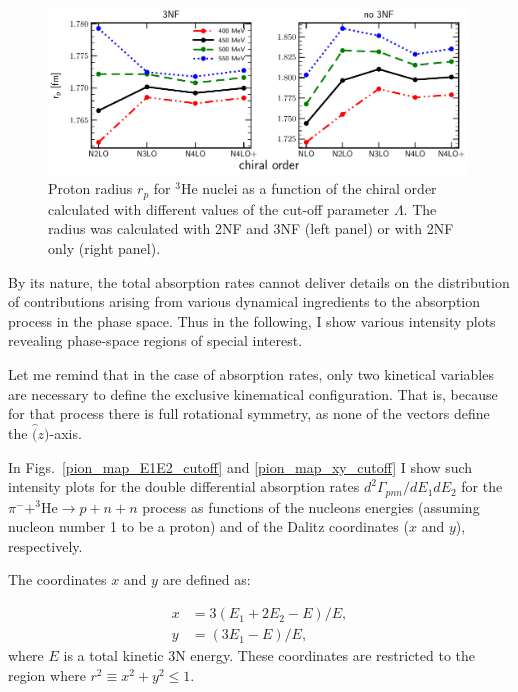     \begin{figure}[h]
        \begin{center}
        \includegraphics[width=0.99\textwidth]{PlotData/PION/Dalitz_maps/figures/proton_radius_mt31_3NF.pdf}
        \end{center}
        \caption{ Proton radius $r_p$ for $^3$He nuclei as a function of the chiral order calculated with
        different values of the cut-off parameter $\Lambda$. The radius was calculated with 2NF and 3NF (left panel)
        or with 2NF only (right panel).}
        \label{proton_rad}
    \end{figure}


    By its nature, the total absorption rates cannot deliver details
    on the distribution of contributions arising from various dynamical ingredients
    to the absorption process in the phase space. Thus in the following, I show 
    various intensity plots revealing phase-space regions of special interest.

    Let me remind that in the case of absorption rates, only two kinetical variables are
    necessary to define the exclusive kinematical configuration. That is, because for that
    process there is full rotational symmetry, as none of the vectors define the $\hat(z)$-axis.


    In Figs.~\ref{pion_map_E1E2_cutoff} and \ref{pion_map_xy_cutoff} I show such
    intensity plots for the double differential absorption rates
    $d^2 \Gamma_{pnn}/dE_1dE_2$ for the $\pi^- + ^3\text{He} \rightarrow p + n + n$
    process as functions of the nucleons energies (assuming nucleon number 1 to be a proton) and 
    of the Dalitz coordinates ($x$ and $y$), respectively.

    The coordinates $x$ and $y$ are defined as:

    \begin{align}
        x &= 3 (E_1 + 2E_2 - E)/E, \nonumber\\
        y &= (3E_1 - E)/E,
        \label{dalitz_xy}
    \end{align}
    where $E$ is a total kinetic 3N energy. 
    These coordinates are restricted to the region where $r^2 \equiv x^2 + y^2 \leq 1$.

